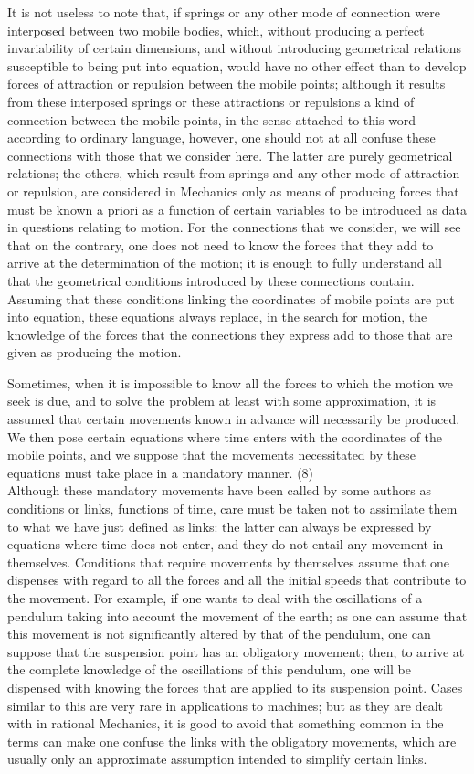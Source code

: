 \documentclass{book}
\begin{document}
It is not useless to note that, if springs or any other mode of connection were interposed between two mobile bodies, which, without producing a perfect invariability of certain dimensions, and without introducing geometrical relations susceptible to being put into equation, would have no other effect than to develop forces of attraction or repulsion between the mobile points; although it results from these interposed springs or these attractions or repulsions a kind of connection between the mobile points, in the sense attached to this word according to ordinary language, however, one should not at all confuse these connections with those that we consider here. The latter are purely geometrical relations; the others, which result from springs and any other mode of attraction or repulsion, are considered in Mechanics only as means of producing forces that must be known a priori as a function of certain variables to be introduced as data in questions relating to motion. For the connections that we consider, we will see that on the contrary, one does not need to know the forces that they add to arrive at the determination of the motion; it is enough to fully understand all that the geometrical conditions introduced by these connections contain. Assuming that these conditions linking the coordinates of mobile points are put into equation, these equations always replace, in the search for motion, the knowledge of the forces that the connections they express add to those that are given as producing the motion.

Sometimes, when it is impossible to know all the forces to which the motion we seek is due, and to solve the problem at least with some approximation, it is assumed that certain movements known in advance will necessarily be produced. We then pose certain equations where time enters with the coordinates of the mobile points, and we suppose that the movements necessitated by these equations must take place in a mandatory manner.
\newpage
(8)\\

Although these mandatory movements have been called by some authors as conditions or links, functions of time, care must be taken not to assimilate them to what we have just defined as links: the latter can always be expressed by equations where time does not enter, and they do not entail any movement in themselves. Conditions that require movements by themselves assume that one dispenses with regard to all the forces and all the initial speeds that contribute to the movement. For example, if one wants to deal with the oscillations of a pendulum taking into account the movement of the earth; as one can assume that this movement is not significantly altered by that of the pendulum, one can suppose that the suspension point has an obligatory movement; then, to arrive at the complete knowledge of the oscillations of this pendulum, one will be dispensed with knowing the forces that are applied to its suspension point. Cases similar to this are very rare in applications to machines; but as they are dealt with in rational Mechanics, it is good to avoid that something common in the terms can make one confuse the links with the obligatory movements, which are usually only an approximate assumption intended to simplify certain links.
\end{document}
